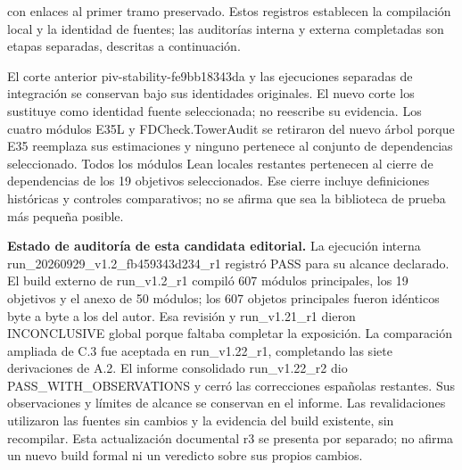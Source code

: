 \documentclass[spanish,11pt,a4paper]{article}
\begin{document}
con enlaces al primer tramo preservado. Estos registros establecen la compilación local y la identidad de fuentes; las auditorías interna y externa completadas son etapas separadas, descritas a continuación.

El corte anterior {\ttfamily\small piv-\discretionary{\hbox{\ensuremath{\hookrightarrow}}}{}{}stability-\discretionary{\hbox{\ensuremath{\hookrightarrow}}}{}{}fe9bb18343da} y las ejecuciones separadas de integración se conservan bajo sus identidades originales. El nuevo corte los sustituye como identidad fuente seleccionada; no reescribe su evidencia. Los cuatro módulos E35L y {\ttfamily\small FDCheck.\discretionary{\hbox{\ensuremath{\hookrightarrow}}}{}{}TowerAudit} se retiraron del nuevo árbol porque E35 reemplaza sus estimaciones y ninguno pertenece al conjunto de dependencias seleccionado. Todos los módulos Lean locales restantes pertenecen al cierre de dependencias de los 19 objetivos seleccionados. Ese cierre incluye definiciones históricas y controles comparativos; no se afirma que sea la biblioteca de prueba más pequeña posible.

\textbf{Estado de auditoría de esta candidata editorial.} La ejecución interna {\ttfamily\small run\_\discretionary{\hbox{\ensuremath{\hookrightarrow}}}{}{}20260929\_\discretionary{\hbox{\ensuremath{\hookrightarrow}}}{}{}v1.\discretionary{\hbox{\ensuremath{\hookrightarrow}}}{}{}2\_\discretionary{\hbox{\ensuremath{\hookrightarrow}}}{}{}fb459343d234\discretionary{\hbox{\ensuremath{\hookrightarrow}}}{}{}\_\discretionary{\hbox{\ensuremath{\hookrightarrow}}}{}{}r1} registró PASS para su alcance declarado. El build externo de {\ttfamily\small run\_\discretionary{\hbox{\ensuremath{\hookrightarrow}}}{}{}v1.\discretionary{\hbox{\ensuremath{\hookrightarrow}}}{}{}2\_\discretionary{\hbox{\ensuremath{\hookrightarrow}}}{}{}r1} compiló 607 módulos principales, los 19 objetivos y el anexo de 50 módulos; los 607 objetos principales fueron idénticos byte a byte a los del autor. Esa revisión y {\ttfamily\small run\_\discretionary{\hbox{\ensuremath{\hookrightarrow}}}{}{}v1.\discretionary{\hbox{\ensuremath{\hookrightarrow}}}{}{}21\_\discretionary{\hbox{\ensuremath{\hookrightarrow}}}{}{}r1} dieron INCONCLUSIVE global porque faltaba completar la exposición. La comparación ampliada de C.3 fue aceptada en {\ttfamily\small run\_\discretionary{\hbox{\ensuremath{\hookrightarrow}}}{}{}v1.\discretionary{\hbox{\ensuremath{\hookrightarrow}}}{}{}22\_\discretionary{\hbox{\ensuremath{\hookrightarrow}}}{}{}r1}, completando las siete derivaciones de A.2. El informe consolidado {\ttfamily\small run\_\discretionary{\hbox{\ensuremath{\hookrightarrow}}}{}{}v1.\discretionary{\hbox{\ensuremath{\hookrightarrow}}}{}{}22\_\discretionary{\hbox{\ensuremath{\hookrightarrow}}}{}{}r2} dio {\ttfamily\small PASS\_\discretionary{\hbox{\ensuremath{\hookrightarrow}}}{}{}WITH\_\discretionary{\hbox{\ensuremath{\hookrightarrow}}}{}{}OBSERVATIONS} y cerró las correcciones españolas restantes. Sus observaciones y límites de alcance se conservan en el informe. Las revalidaciones utilizaron las fuentes sin cambios y la evidencia del build existente, sin recompilar. Esta actualización documental r3 se presenta por separado; no afirma un nuevo build formal ni un veredicto sobre sus propios cambios.
\end{document}
